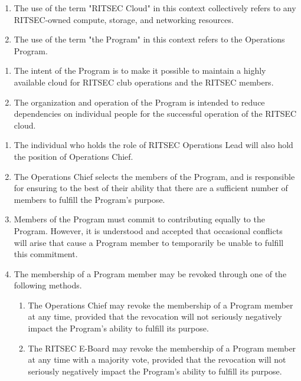 

\begin{enumerate}
	\item The use of the term "RITSEC Cloud" in this context collectively refers to any
	      RITSEC-owned compute, storage, and networking resources.
	\item The use of the term "the Program" in this context refers to the Operations
	      Program.
\end{enumerate}


\begin{enumerate}
	\item The intent of the Program is to make it possible to maintain a highly available
	      cloud for RITSEC club operations and the RITSEC members.
	\item The organization and operation of the Program is intended to reduce
	      dependencies on individual people for the successful operation of the RITSEC
	      cloud.
\end{enumerate}


\begin{enumerate}
	\item The individual who holds the role of RITSEC Operations Lead will also hold the
	      position of Operations Chief.
	\item The Operations Chief selects the members of the Program, and is responsible for
	      ensuring to the best of their ability that there are a sufficient number of
	      members to fulfill the Program's purpose.
	\item Members of the Program must commit to contributing equally to the Program.
	      However, it is understood and accepted that occasional conflicts will arise
	      that cause a Program member to temporarily be unable to fulfill this
	      commitment.
	\item The membership of a Program member may be revoked through one of the following
	      methods.
	      \begin{enumerate}
		      \item The Operations Chief may revoke the membership of a Program member at any time,
		            provided that the revocation will not seriously negatively impact the Program's
		            ability to fulfill its purpose.
		      \item The RITSEC E-Board may revoke the membership of a Program member at any time
		            with a majority vote, provided that the revocation will not seriously
		            negatively impact the Program's ability to fulfill its purpose.
	      \end{enumerate}
\end{enumerate}

